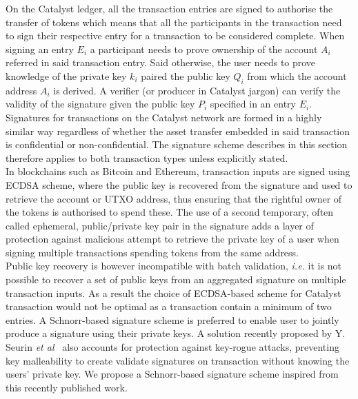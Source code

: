 On the Catalyst ledger, all the transaction entries are signed to authorise the transfer of tokens which means that all the participants in the transaction need to sign their respective entry for a transaction to be considered complete. When signing an entry $E_i$ a participant needs to prove ownership of the account $A_i$ referred in said transaction entry. Said otherwise, the user needs to prove knowledge of the private key $k_i$ paired the public key $Q_i$ from which the account address $A_i$ is derived. A verifier (or producer in Catalyst jargon) can verify the validity of the signature given the public key $P_i$ specified in an entry $E_i$.\\

Signatures for transactions on the Catalyst network are formed in a highly similar way regardless of whether the asset transfer embedded in said transaction is confidential or non-confidential. The signature scheme describes in this section therefore applies to both transaction types unless explicitly stated. \\

In blockchains such as Bitcoin and Ethereum, transaction inputs are signed using ECDSA scheme, where the public key is recovered from the signature and used to retrieve the account or UTXO address, thus ensuring that the rightful owner of the tokens is authorised to spend these. The use of a second temporary, often called ephemeral, public/private key pair in the signature adds a layer of protection against malicious attempt to retrieve the private key of a user when signing multiple transactions spending tokens from the same address.\\
 
 Public key recovery is however incompatible with batch validation, \textit{i.e.} it is not possible to recover a set of public keys from an aggregated signature on multiple transaction inputs. As a result the choice of ECDSA-based scheme for Catalyst transaction would not be optimal as a transaction contain a minimum of two entries. A Schnorr-based signature scheme is preferred to enable user to jointly produce a signature using their private keys. A solution recently proposed by Y. Seurin \textit{et al}~\cite{schnorr} also accounts for protection against key-rogue attacks, preventing key malleability to create validate signatures on transaction without knowing the users' private key. We propose a Schnorr-based signature scheme inspired from this recently published work. \\

